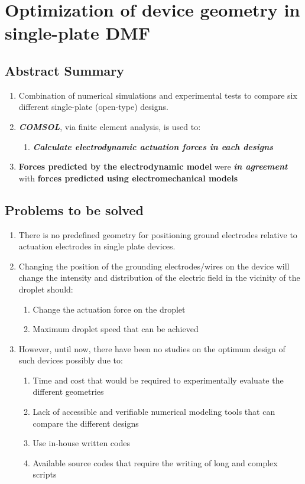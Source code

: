 \chapter{Optimization of device geometry in single-plate DMF}
\section{Abstract Summary}
\begin{enumerate}
    \item Combination of numerical simulations and experimental tests to compare six different single-plate (open-type) designs.
    \item \textbf{\emph{COMSOL}}, via finite element analysis, is used to:
        \begin{enumerate}
            \item \textbf{\emph{Calculate electrodynamic actuation forces in each designs}}
        \end{enumerate}
    \item \textbf{Forces predicted by the electrodynamic model} were \textbf{\emph{in agreement}} with \textbf{forces predicted using electromechanical models}
\end{enumerate}

\section{Problems to be solved}
\begin{enumerate}
    \item There is no predefined geometry for positioning ground electrodes relative to actuation electrodes in single plate devices.
    \item Changing the position of the grounding electrodes/wires on the device will change the intensity and distribution of the electric field in the vicinity of the droplet should:
    \begin{enumerate}
        \item Change the actuation force on the droplet
        \item Maximum droplet speed that can be achieved
    \end{enumerate}
    \item However, until now, there have been no studies on the optimum design of such devices possibly due to:
    \begin{enumerate}
        \item Time and cost that would be required to experimentally evaluate the different geometries
        \item Lack of accessible and verifiable numerical modeling tools that can compare the different designs
        \item Use in-house written codes 
        \item Available source codes that require the writing of long and complex scripts
    \end{enumerate}
\end{enumerate}

